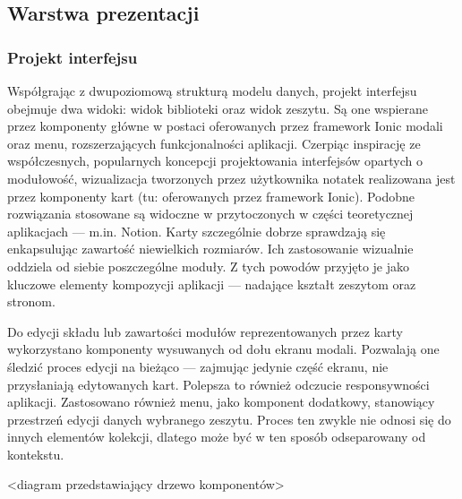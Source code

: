 \subsection{Warstwa prezentacji}
\subsubsection{Projekt interfejsu}
Współgrając z dwupoziomową strukturą modelu danych, projekt interfejsu obejmuje dwa widoki: widok biblioteki oraz widok zeszytu.
Są one wspierane przez komponenty główne w postaci oferowanych przez framework Ionic modali oraz menu,
rozszerzających funkcjonalności aplikacji. Czerpiąc inspirację ze współczesnych, popularnych koncepcji projektowania interfejsów
opartych o modułowość, wizualizacja tworzonych przez użytkownika notatek realizowana jest przez komponenty
kart (tu: oferowanych przez framework Ionic). Podobne rozwiązania stosowane są widoczne w przytoczonych w części teoretycznej
aplikacjach — m.in. Notion. Karty szczególnie dobrze sprawdzają się enkapsulując zawartość niewielkich rozmiarów.
Ich zastosowanie wizualnie oddziela od siebie poszczególne moduły. Z tych powodów przyjęto je jako kluczowe elementy
kompozycji aplikacji — nadające kształt zeszytom oraz stronom.

Do edycji składu lub zawartości modułów reprezentowanych przez karty wykorzystano komponenty wysuwanych od dołu ekranu modali.
Pozwalają one śledzić proces edycji na bieżąco — zajmując jedynie część ekranu, nie przysłaniają edytowanych kart.
Polepsza to również odczucie responsywności aplikacji.
Zastosowano również menu, jako komponent dodatkowy, stanowiący przestrzeń edycji danych wybranego zeszytu. Proces ten zwykle
nie odnosi się do innych elementów kolekcji, dlatego może być w ten sposób odseparowany od kontekstu.

<diagram przedstawiający drzewo komponentów>

